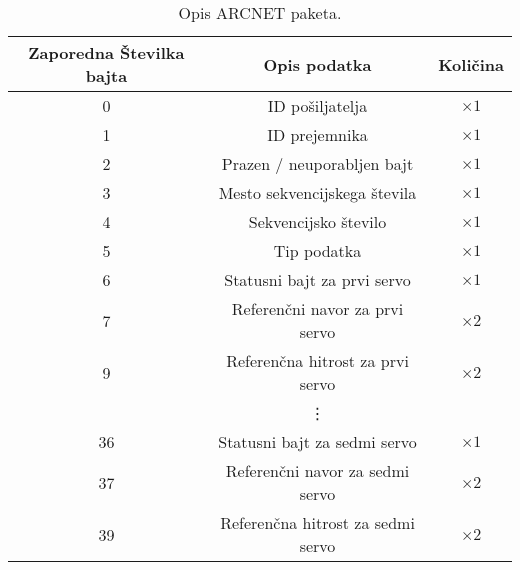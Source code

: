 
\begin{table}[h]
	\centering
	\begin{footnotesize}
		\begin{tabular}{|c c c |}
		Zaporedna \v{S}tevilka bajta & Opis podatka & Koli\v{c}ina\\ \hline
		0 & ID po\v{s}iljatelja & $\times 1$ \\
		1 & ID prejemnika & $\times 1$ \\
		2 & Prazen / neuporabljen bajt & $\times 1$ \\
		3 & Mesto sekvencijskega \v{s}tevila & $\times 1$\\
		4 & Sekvencijsko \v{s}tevilo & $\times 1$\\
		5 & Tip podatka & $\times 1$  \\
		6 & Statusni bajt za prvi servo & $\times 1$ \\ 
		7 & Referen\v{c}ni navor za prvi servo & $\times 2$ \\ 
		9 & Referen\v{c}na hitrost za prvi servo & $\times 2$ \\ 
		& \vdots & \\
		36 & Statusni bajt za sedmi servo & $\times 1$ \\ 
		37 & Referen\v{c}ni navor za sedmi servo & $\times 2$ \\ 
		39 & Referen\v{c}na hitrost za sedmi servo & $\times 2$ \\ \hline
		\end{tabular}
	\end{footnotesize}
	\caption{Opis ARCNET paketa.}
	\label{table:arcnet-command}
\end{table}